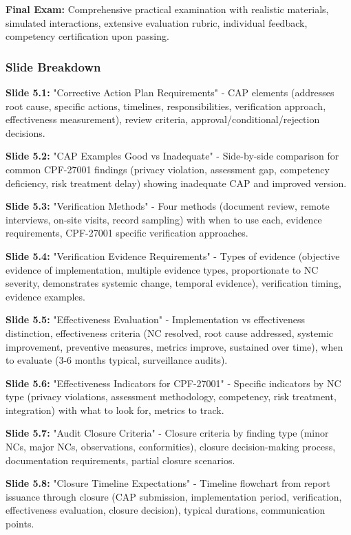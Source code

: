 \documentclass[11pt,a4paper]{article}
\begin{document}
\textbf{Final Exam:} Comprehensive practical examination with realistic materials, simulated interactions, extensive evaluation rubric, individual feedback, competency certification upon passing.

\subsubsection{Slide Breakdown}

\textbf{Slide 5.1:} "Corrective Action Plan Requirements" - CAP elements (addresses root cause, specific actions, timelines, responsibilities, verification approach, effectiveness measurement), review criteria, approval/conditional/rejection decisions.

\textbf{Slide 5.2:} "CAP Examples Good vs Inadequate" - Side-by-side comparison for common CPF-27001 findings (privacy violation, assessment gap, competency deficiency, risk treatment delay) showing inadequate CAP and improved version.

\textbf{Slide 5.3:} "Verification Methods" - Four methods (document review, remote interviews, on-site visits, record sampling) with when to use each, evidence requirements, CPF-27001 specific verification approaches.

\textbf{Slide 5.4:} "Verification Evidence Requirements" - Types of evidence (objective evidence of implementation, multiple evidence types, proportionate to NC severity, demonstrates systemic change, temporal evidence), verification timing, evidence examples.

\textbf{Slide 5.5:} "Effectiveness Evaluation" - Implementation vs effectiveness distinction, effectiveness criteria (NC resolved, root cause addressed, systemic improvement, preventive measures, metrics improve, sustained over time), when to evaluate (3-6 months typical, surveillance audits).

\textbf{Slide 5.6:} "Effectiveness Indicators for CPF-27001" - Specific indicators by NC type (privacy violations, assessment methodology, competency, risk treatment, integration) with what to look for, metrics to track.

\textbf{Slide 5.7:} "Audit Closure Criteria" - Closure criteria by finding type (minor NCs, major NCs, observations, conformities), closure decision-making process, documentation requirements, partial closure scenarios.

\textbf{Slide 5.8:} "Closure Timeline Expectations" - Timeline flowchart from report issuance through closure (CAP submission, implementation period, verification, effectiveness evaluation, closure decision), typical durations, communication points.
\end{document}
